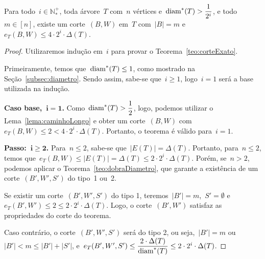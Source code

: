 	\begin{teo}
	\label{teo:corteExato}
		Para todo~${i\in \mathbb{N^+_*}}$, toda árvore~$T$ com~$n$
		vértices e~${\mathrm{diam}^*(T)>\dfrac{1}{2^i}}$, e todo~${m\in[n]}$,
		existe um corte~$(B,W)$ em~$T$ com~$|B|=m$ 
		e~$e_T(B,W)\le 4\cdot 2^i\cdot \Delta(T)$.
	\end{teo}

	\medskip
	\medskip

	\begin{proof}
		Utilizaremos indução em~$i$ para provar o Teorema~\ref{teo:corteExato}.
		
		Primeiramente, temos que~${\mathrm{diam}^*(T)\le1}$, como mostrado 
		na Seção~\ref{subsec:diametro}. 
		Sendo assim, sabe-se que~${i\ge1}$, logo~${i=1}$ será a base 
		utilizada na indução.
		
		\textbf{Caso base,~${\mathbf {i=1}}$.}
		Como~${\mathrm{diam}^*(T)>\dfrac{1}{2}}$, logo, 
		podemos utilizar o Lema~\ref{lema:caminhoLongo} e obter 
		um corte~$(B,W)$ 
		com~${e_T(B,W)\le 2 < 4\cdot 2^i\cdot \Delta(T)}$.
		Portanto, o teorema é válido para~${i=1}$.


		\textbf{Passo:~${\mathbf{i\ge 2}}$.} 
		Para~${n\le 2}$, sabe-se que~${|E(T)|=\Delta(T)}$. 
		Portanto, para~${n\le 2}$, temos 
		que~${e_T(B,W)\le |E(T)|=\Delta(T)\le 2\cdot 2^i\cdot 
		\Delta(T)}$.
		Porém, se~${n>2}$, podemos aplicar o
		Teorema~\ref{teo:dobraDiametro}, que garante a existência 
		de um corte~$(B',W',S')$ do tipo~1 ou~2.

			Se existir um corte~$(B',W',S')$ do tipo 1, 
			teremos~${|B'|=m}$,~${S'=\emptyset}$
			e~${e_T(B',W')\le2\le 2\cdot 2^i\cdot \Delta(T)}$.
			Logo, o corte~$(B',W')$ satisfaz as propriedades
			do corte do teorema.

			Caso contrário, o corte~$(B',W',S')$ será do tipo 2, ou 
			seja,~${|B'|=m}$ ou~${|B'|<m\le |B'|+|S'|}$, 
			e~${e_T(B',W',S')\le \dfrac{2\cdot\Delta(T)}{\mathrm{diam}^*(T)}\le
			2\cdot2^i\cdot\Delta(T)}$.
			

\end{proof}
